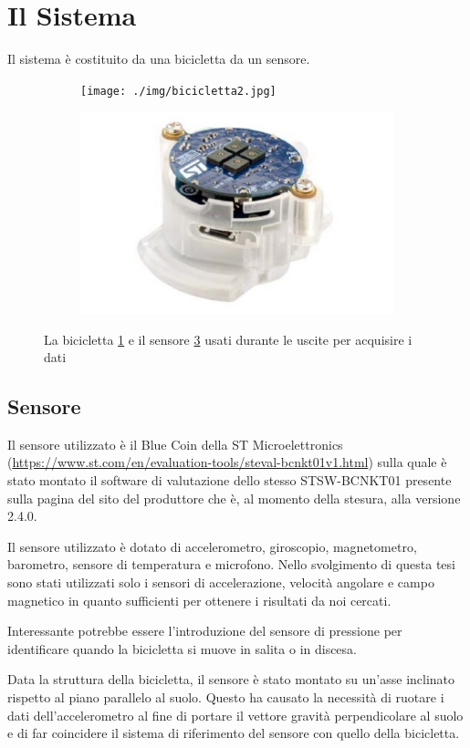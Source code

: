 \documentclass[class=article]{standalone}
\begin{document}
	\section{Il Sistema}
	Il sistema è costituito da una bicicletta da un sensore.
	
	\begin{figure}[h]
	\begin{subfigure}[h]{0.5\textwidth}
		\texttt{[image: ./img/bicicletta2.jpg]}
		\caption{}
		\label{fig:bici}
	\end{subfigure}
	\hfill
	\begin{subfigure}[h]{0.5\textwidth}
		\includegraphics[width=0.8\linewidth]{./img/bluecoin.jpg}
		\caption{}
		\label{fig:sensore}
	\end{subfigure}
	
	\caption[width=0.5\textwidth]{La bicicletta \ref{fig:bici} e il sensore \ref{fig:sensore} usati durante le uscite per acquisire i dati}
	\end{figure}
	
	\subsection{Sensore}
	Il sensore utilizzato è il Blue Coin della ST Microelettronics (\url{https://www.st.com/en/evaluation-tools/steval-bcnkt01v1.html}) sulla quale è stato montato il software di valutazione dello stesso STSW-BCNKT01 presente sulla pagina del sito del produttore che è, al momento della stesura, alla versione 2.4.0.
	
	Il sensore utilizzato è dotato di accelerometro, giroscopio, magnetometro, barometro, sensore di temperatura e microfono. Nello svolgimento di questa tesi sono stati utilizzati solo i sensori di accelerazione, velocità angolare e campo magnetico in quanto sufficienti per ottenere i risultati da noi cercati.
	
	Interessante potrebbe essere l'introduzione del sensore di pressione per identificare quando la bicicletta si muove in salita o in discesa.
	
	Data la struttura della bicicletta, il sensore è stato montato su un'asse inclinato rispetto al piano parallelo al suolo. Questo ha causato la necessità di ruotare i dati dell'accelerometro al fine di portare il vettore gravità perpendicolare al suolo e di far coincidere il sistema di riferimento del sensore con quello della bicicletta.
	
	
\end{document}
